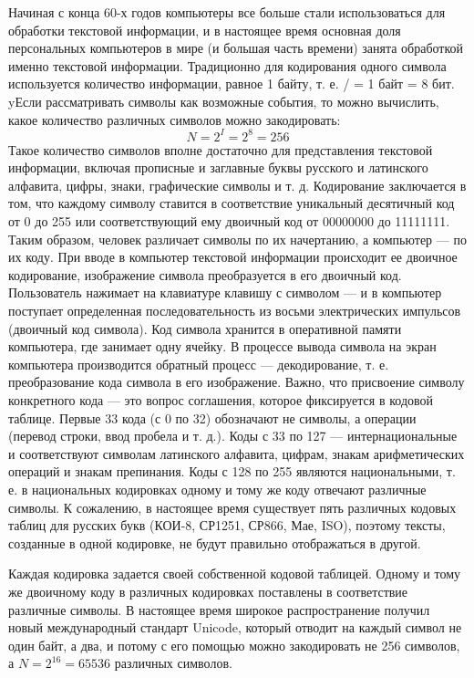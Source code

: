 \documentclass[a4paper]{article}
\begin{document}
Начиная с конца 60-х годов компьютеры все больше стали использоваться для обработки текстовой информации, и в настоящее время основная доля персональных компьютеров в мире (и большая часть времени) занята обработкой именно текстовой информации. Традиционно для кодирования одного символа используется количество информации, равное 1 байту, т. е. / = 1 байт = 8 бит. yЕсли рассматривать символы как возможные события, то можно вычислить, какое количество различных символов можно закодировать:
\[N = 2^{I} = 2^{8} = 256 \]
Такое количество символов вполне достаточно для представления текстовой информации, включая прописные и заглавные буквы русского и латинского алфавита, цифры, знаки, графические символы и т. д. Кодирование заключается в том, что каждому символу ставится в соответствие уникальный десятичный код от 0 до 255 или соответствующий ему двоичный код от 00000000 до 11111111. Таким образом, человек различает символы по их начертанию, а компьютер — по их коду. При вводе в компьютер текстовой информации происходит ее двоичное кодирование, изображение символа преобразуется в его двоичный код. Пользователь нажимает на клавиатуре клавишу с символом — и в компьютер поступает определенная последовательность из восьми электрических импульсов (двоичный код символа). Код символа хранится в оперативной памяти компьютера, где занимает одну ячейку. В процессе вывода символа на экран компьютера производится обратный процесс — декодирование, т. е. преобразование кода символа в его изображение. Важно, что присвоение символу конкретного кода — это вопрос соглашения, которое фиксируется в кодовой таблице. Первые 33 кода (с 0 по 32) обозначают не символы, а операции (перевод строки, ввод пробела и т. д.). Коды с 33 по 127 — интернациональные и соответствуют символам латинского алфавита, цифрам, знакам арифметических операций и знакам препинания. Коды с 128 по 255 являются национальными, т. е. в национальных кодировках одному и тому же коду отвечают различные символы. К сожалению, в настоящее время существует пять различных кодовых таблиц для русских букв (КОИ-8, СР1251, СР866, Мае, ISO), поэтому тексты, созданные в одной кодировке, не будут правильно отображаться в другой.

Каждая кодировка задается своей собственной кодовой таблицей. Одному и тому же двоичному коду в различных кодировках поставлены в соответствие различные символы. В настоящее время широкое распространение получил новый международный стандарт Unicode, который отводит на каждый символ не один байт, а два, и потому с его помощью можно закодировать не 256 символов, а  $N = 2^{16} = 65536$ различных символов.
\end{document}
